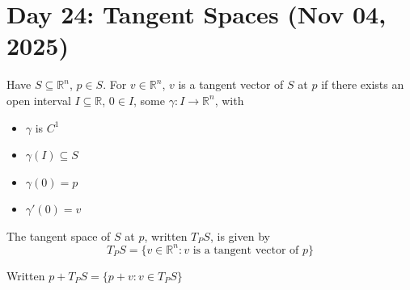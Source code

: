 \section{Day 24: Tangent Spaces (Nov 04, 2025)}

\begin{definition}
Have $S \subseteq \mathbb{R}^n$, $p \in S$. For $v \in \mathbb{R}^n$, $v$ is a tangent vector of $S$ at $p$ if there exists an open interval $I \subseteq \mathbb{R}$, $0 \in I$, some $\gamma : I \to \mathbb{R}^n$, with
\begin{itemize}
\item $\gamma$ is $C^1$
    \item $\gamma(I) \subseteq S$
    \item $\gamma(0) = p$
    \item $\gamma'(0) = v$
\end{itemize}
\end{definition}

\begin{definition}
The tangent space of $S$ at $p$, written $T_PS$, is given by
\[
    T_PS = \{ v \in \mathbb{R}^n : \text{$v$ is a tangent vector of $p$} \}
\]
\end{definition}

\begin{definition} Written $p + T_PS = \{ p + v : v \in T_PS \}$
\end{definition}
